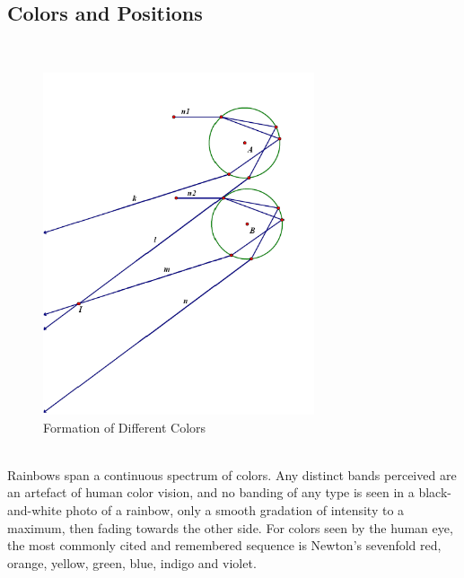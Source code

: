 \documentclass{article}
\begin{document}
\begin{spacing}{1.5}
\subsection{Colors and Positions}
\ \\
\begin{figure}[!htb]
\centering
\includegraphics[width=8cm]{2_3.png}
\caption{Formation of Different Colors}
\end{figure}
\\
Rainbows span a continuous spectrum of colors. Any distinct bands perceived are an artefact of human color vision, and no banding of any type is seen in a black-and-white photo of a rainbow, only a smooth gradation of intensity to a maximum, then fading towards the other side. For colors seen by the human eye, the most commonly cited and remembered sequence is Newton's sevenfold red, orange, yellow, green, blue, indigo and violet.

\end{spacing}
\end{document}
